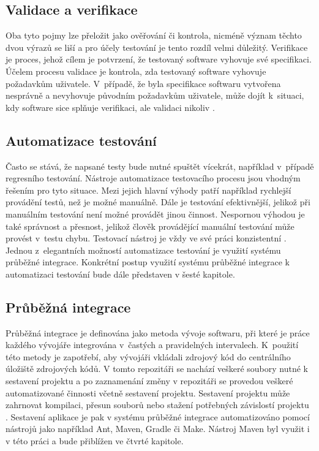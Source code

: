 \documentclass[
    color,   %
	table,   %
    twoside, %
]{fithesis3}
\begin{document}
\subsection{Validace a verifikace}
Oba tyto pojmy lze přeložit jako ověřování či kontrola, nicméně význam těchto dvou výrazů se liší a pro účely testování je tento rozdíl velmi důležitý. Verifikace je proces, jehož cílem je potvrzení, že testovaný software vyhovuje své specifikaci. Účelem procesu validace je kontrola, zda testovaný software vyhovuje požadavkům uživatele. V~případě, že byla specifikace softwaru vytvořena nesprávně a nevyhovuje původním požadavkům uživatele, může dojít k~situaci, kdy software sice splňuje verifikaci, ale validaci nikoliv \cite{Patton}.

\subsection{Automatizace testování}
Často se stává, že napsané testy bude nutné spuštět vícekrát, například v~případě regresního testování. Nástroje automatizace testovacího procesu jsou vhodným řešením pro tyto situace. Mezi jejich hlavní výhody patří například rychlejší provádění testů, než je možné manuálně. Dále je testování efektivnější, jelikož při manuálním testování není možné provádět jinou činnost. Nespornou výhodou je také správnost a přesnost, jelikož člověk provádějící manuální testování může provést v~testu chybu. Testovací nástroj je vždy ve své práci konzistentní \cite{Patton}. Jednou z~elegantních možností automatizace testování je využití systému průběžné integrace. Konkrétní postup využití systému průběžné integrace k automatizaci testování bude dále představen v šesté kapitole.

\subsection{Průběžná integrace}
Průběžná integrace je definována jako metoda vývoje softwaru, při které je práce každého vývojáře integrována v~častých a pravidelných intervalech. K~použití této metody je zapotřebí, aby vývojáři vkládali zdrojový kód do centrálního úložiště zdrojových kódů. V tomto repozitáři se nachází veškeré soubory nutné k sestavení projektu a po zaznamenání změny v repozitáři se provedou veškeré automatizované činnosti včetně sestavení projektu. Sestavení projektu může zahrnovat kompilaci, přesun souborů nebo stažení potřebných závislostí projektu \cite{Fowler}. Sestavení aplikace je pak v systému průběžné integrace automatizováno pomocí nástrojů jako například Ant, Maven, Gradle či Make. Nástroj Maven byl využit i v této práci a bude přiblížen ve čtvrté kapitole.
\end{document}
